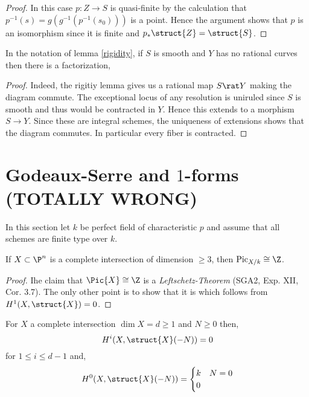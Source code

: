 \documentclass[12pt]{article}
\begin{document}
\begin{proof}
In this case $p : Z \to S$ is quasi-finite by the calculation that $p^{-1}(s) = g(g^{-1}(p^{-1}(s_0)))$ is a point. Hence the argument shows that $p$ is an isomorphism since it is finite and $p_* \struct{Z} = \struct{S}$.
\end{proof}

\begin{cor}
In the notation of lemma \ref{rigidity}, if $S$ is smooth and $Y$ has no rational curves then there is a factorization,
\begin{center}
\end{center}
\end{cor}

\begin{proof}
Indeed, the rigitiy lemma gives us a rational map $S \rat Y$ making the diagram commute. The exceptional locus of any resolution is uniruled since $S$ is smooth and thus would be contracted in $Y$. Hence this extends to a morphism $S \to Y$. Since these are integral schemes, the uniqueness of extensions shows that the diagram commutes. In particular every fiber is contracted. 
\end{proof}

\newpage

\section{Godeaux-Serre and $1$-forms (TOTALLY WRONG)}

\newcommand{\fPic}{\mathrm{Pic}}

In this section let $k$ be perfect field of characteristic $p$ and assume that all schemes are finite type over $k$.

\begin{lemma}
If $X \subset \P^n$ is a complete intersection of dimension $\ge 3$, then $\fPic_{X/k} \cong \Z$. 
\end{lemma}

\begin{proof}
Ihe claim that $\Pic{X} \cong \Z$ is a \textit{Leftschetz-Theorem} (SGA2, Exp. XII, Cor. 3.7). The only other point is to show that it is \etale which follows from $H^1(X, \struct{X}) = 0$. 
\end{proof}

\begin{prop}
For $X$ a complete intersection $\dim{X} = d \ge 1$ and $N \ge 0$ then,
\[ H^i(X, \struct{X}(-N)) = 0 \]
for $1 \le i \le d - 1$ and,
\[ H^0(X, \struct{X}(-N)) = 
\begin{cases}
k & N = 0 
\\
0
\end{cases} \]
\end{prop}
\end{document}
